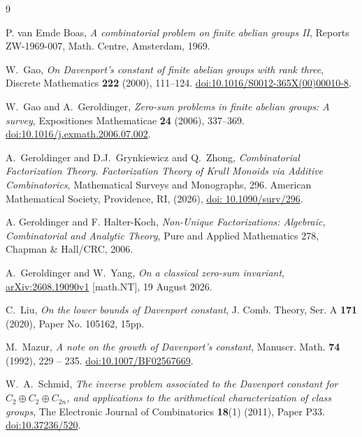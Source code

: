 \documentclass[11pt,a4paper]{amsart}
\theoremstyle{plain}
\theoremstyle{definition}
\begin{document}
\begin{thebibliography}{9}
\raggedright

{P. van} {Emde Boas}, \emph{A combinatorial problem on finite abelian groups
  {II}}, Reports ZW-1969-007, Math. Centre, Amsterdam, 1969.


W.~Gao, \emph{On Davenport's constant of finite abelian groups
with rank three}, Discrete Mathematics \textbf{222} (2000),
111--124.
\href{https://doi.org/10.1016/S0012-365X(00)00010-8}
{doi:10.1016/S0012-365X(00)00010-8}.

W.~Gao and A.~Geroldinger, \emph{Zero-sum problems in finite
abelian groups: A survey}, Expositiones Mathematicae
\textbf{24} (2006), 337--369.
\href{https://doi.org/10.1016/j.exmath.2006.07.002}
{doi:10.1016/j.exmath.2006.07.002}.

A.~Geroldinger and D.J.~Grynkiewicz and Q.~Zhong,
\emph{Combinatorial Factorization Theory. Factorization Theory of Krull Monoids via Additive Combinatorics},
Mathematical Surveys and Monographs, 296. American Mathematical Society, Providence, RI, (2026),
\href{https://bookstore.ams.org/view?ProductCode=SURV/296}{doi: 10.1090/surv/296}.

A. Geroldinger and F. Halter-Koch,
\emph{Non-Unique Factorizations: Algebraic, Combinatorial and
Analytic Theory},
Pure and Applied Mathematics 278, Chapman \& Hall/CRC, 2006.

A.~Geroldinger and W.~Yang, \emph{On a classical zero-sum
invariant},
\href{https://arxiv.org/abs/2608.19090v1}{arXiv:2608.19090v1}
[math.NT], 19 August 2026.

C.~Liu,
\emph{On the lower bounds of {D}avenport constant},
J. Comb. Theory, Ser. A {\bf 171} (2020), {Paper No. 105162, 15pp}.


M.~Mazur,
\emph{A note on the growth of {D}avenport's constant},
Manuscr. Math. {\bf 74} (1992), 229 -- 235. \href{https://doi.org/10.1007/BF02567669}{doi:10.1007/BF02567669}.


W.~A.~Schmid, \emph{The inverse problem associated to the
Davenport constant for $C_2\oplus C_2\oplus C_{2n}$, and
applications to the arithmetical characterization of class
groups}, The Electronic Journal of Combinatorics
\textbf{18}(1) (2011), Paper P33.
\href{https://doi.org/10.37236/520}{doi:10.37236/520}.
\end{thebibliography}
\end{document}
